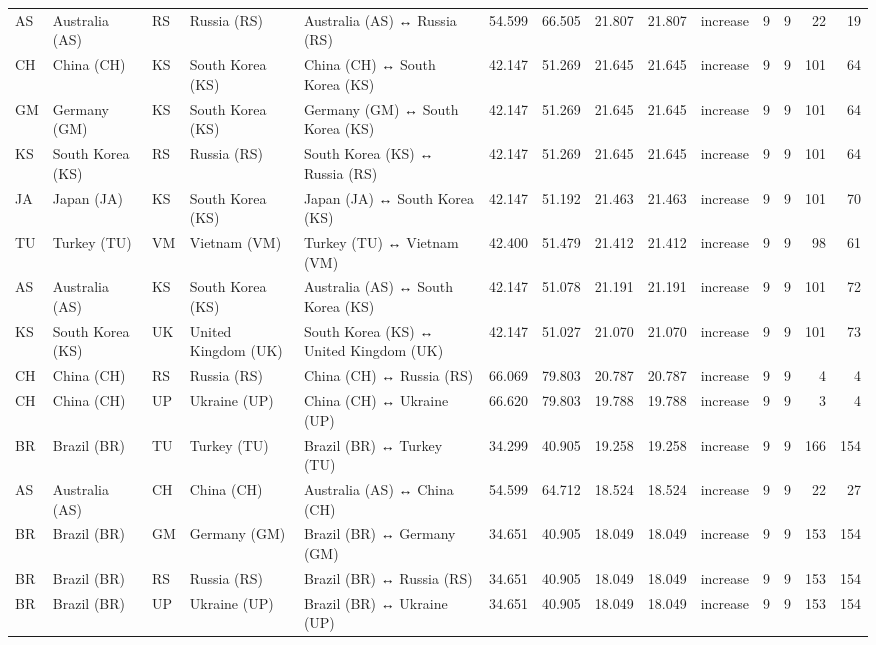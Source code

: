 \begin{tabular}{lllllrrrrlrrrr}
AS & Australia (AS) & RS & Russia (RS) & Australia (AS) ↔ Russia (RS) & 54.599 & 66.505 & 21.807 & 21.807 & increase & 9 & 9 & 22 & 19 \\
CH & China (CH) & KS & South Korea (KS) & China (CH) ↔ South Korea (KS) & 42.147 & 51.269 & 21.645 & 21.645 & increase & 9 & 9 & 101 & 64 \\
GM & Germany (GM) & KS & South Korea (KS) & Germany (GM) ↔ South Korea (KS) & 42.147 & 51.269 & 21.645 & 21.645 & increase & 9 & 9 & 101 & 64 \\
KS & South Korea (KS) & RS & Russia (RS) & South Korea (KS) ↔ Russia (RS) & 42.147 & 51.269 & 21.645 & 21.645 & increase & 9 & 9 & 101 & 64 \\
JA & Japan (JA) & KS & South Korea (KS) & Japan (JA) ↔ South Korea (KS) & 42.147 & 51.192 & 21.463 & 21.463 & increase & 9 & 9 & 101 & 70 \\
TU & Turkey (TU) & VM & Vietnam (VM) & Turkey (TU) ↔ Vietnam (VM) & 42.400 & 51.479 & 21.412 & 21.412 & increase & 9 & 9 & 98 & 61 \\
AS & Australia (AS) & KS & South Korea (KS) & Australia (AS) ↔ South Korea (KS) & 42.147 & 51.078 & 21.191 & 21.191 & increase & 9 & 9 & 101 & 72 \\
KS & South Korea (KS) & UK & United Kingdom (UK) & South Korea (KS) ↔ United Kingdom (UK) & 42.147 & 51.027 & 21.070 & 21.070 & increase & 9 & 9 & 101 & 73 \\
CH & China (CH) & RS & Russia (RS) & China (CH) ↔ Russia (RS) & 66.069 & 79.803 & 20.787 & 20.787 & increase & 9 & 9 & 4 & 4 \\
CH & China (CH) & UP & Ukraine (UP) & China (CH) ↔ Ukraine (UP) & 66.620 & 79.803 & 19.788 & 19.788 & increase & 9 & 9 & 3 & 4 \\
BR & Brazil (BR) & TU & Turkey (TU) & Brazil (BR) ↔ Turkey (TU) & 34.299 & 40.905 & 19.258 & 19.258 & increase & 9 & 9 & 166 & 154 \\
AS & Australia (AS) & CH & China (CH) & Australia (AS) ↔ China (CH) & 54.599 & 64.712 & 18.524 & 18.524 & increase & 9 & 9 & 22 & 27 \\
BR & Brazil (BR) & GM & Germany (GM) & Brazil (BR) ↔ Germany (GM) & 34.651 & 40.905 & 18.049 & 18.049 & increase & 9 & 9 & 153 & 154 \\
BR & Brazil (BR) & RS & Russia (RS) & Brazil (BR) ↔ Russia (RS) & 34.651 & 40.905 & 18.049 & 18.049 & increase & 9 & 9 & 153 & 154 \\
BR & Brazil (BR) & UP & Ukraine (UP) & Brazil (BR) ↔ Ukraine (UP) & 34.651 & 40.905 & 18.049 & 18.049 & increase & 9 & 9 & 153 & 154 \\

\end{tabular}
